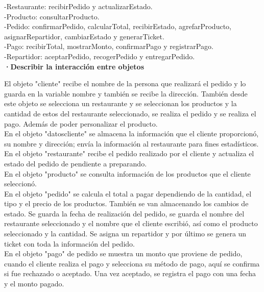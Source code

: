 \documentclass[12pt]{article}
\begin{document}
-Restaurante: recibirPedido y actualizarEstado. \\

-Producto: consultarProducto. \\

-Pedido: confirmarPedido, calcularTotal, recibirEstado, agrefarProducto, asignarRepartidor, cambiarEstado y generarTicket. \\

-Pago: recibirTotal, mostrarMonto, confirmarPago y registrarPago. \\

-Repartidor: aceptarPedido, recogerPedido y entregarPedido. \\

\textbf{·Describir la interacción entre objetos}

El objeto "cliente" recibe el nombre de la persona que realizará el pedido y lo guarda en la variable nombre y también se recibe la dirección. También desde este objeto se selecciona un restaurante y se seleccionan los productos y la cantidad de estos del restaurante seleccionado, se realiza el pedido y se realiza el pago. Además de poder personalizar el producto. \\

En el objeto "datoscliente" se almacena la información que el cliente proporcionó, su nombre y dirección; envía la información al restaurante para fines estadísticos. \\

En el objeto "restaurante" recibe el pedido realizado por el cliente y actualiza el estado del pedido de pendiente a preparando. \\

En el objeto "producto" se consulta información de los productos que el cliente seleccionó. \\

En el objeto "pedido" se calcula el total a pagar dependiendo de la cantidad, el tipo y el precio de los productos. También se van almacenando los cambios de estado. Se guarda la fecha de realización del pedido, se guarda el nombre del restaurante seleccionado y el nombre que el cliente escribió, así como el producto seleccionado y la cantidad. Se asigna un repartidor y por último se genera un ticket con toda la información del pedido. \\

En el objeto "pago" de pedido se muestra un monto que proviene de pedido, cuando el cliente realiza el pago y selecciona su método de pago, aquí se confirma si fue rechazado o aceptado. Una vez aceptado, se registra el pago con una fecha y el monto pagado. \\
\end{document}
